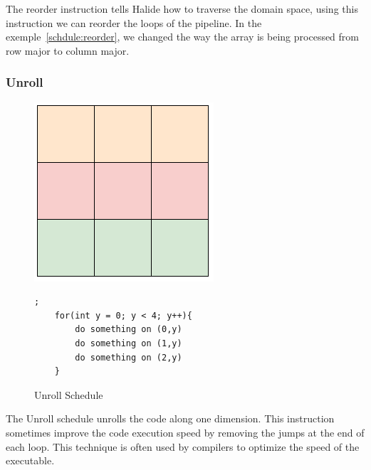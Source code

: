 	The reorder instruction tells Halide how to traverse the domain space, using this instruction we can reorder the loops of the pipeline. In the exemple~\ref{schdule:reorder}, we changed the way the array is being processed from row major to column major.



	\subsubsection{Unroll}


\begin{figure}[H]
		\begin{minipage}[c]{\EIW}
			\centering
		\includegraphics[width=\textwidth]{Images/Unroll.png}
		\end{minipage}
		\begin{minipage}[c]{\ECW}
			\centering
			\begin{lstlisting}[label={code:reorder}];
	for(int y = 0; y < 4; y++){
		do something on (0,y)
		do something on (1,y)
		do something on (2,y)
	}

\end{lstlisting}
		\end{minipage}
	\caption{Unroll Schedule}
	\label{schedule:unroll}
\end{figure}
	The Unroll schedule unrolls the code along one dimension. This instruction sometimes improve the code execution speed by removing the jumps at the end of each loop. This technique is often used by compilers to optimize the speed of the executable.

